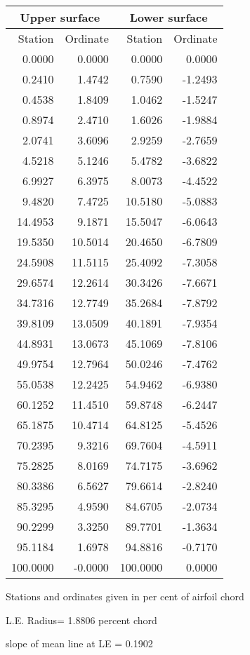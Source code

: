 \documentclass[11pt]{book}
\begin{document}
 \hspace{4mm}
 \begin{tabular}{|r|r|r|r|} \hline 
 \multicolumn{2}{|c|}{Upper surface} & \multicolumn{2}{|c|}{Lower surface} \\
 \hline
 Station & Ordinate & Station & Ordinate \\
 \hline
0.0000 & 0.0000 & 0.0000 & 0.0000 \\
0.2410 & 1.4742 & 0.7590 & -1.2493 \\
0.4538 & 1.8409 & 1.0462 & -1.5247 \\
0.8974 & 2.4710 & 1.6026 & -1.9884 \\
2.0741 & 3.6096 & 2.9259 & -2.7659 \\
4.5218 & 5.1246 & 5.4782 & -3.6822 \\
6.9927 & 6.3975 & 8.0073 & -4.4522 \\
9.4820 & 7.4725 & 10.5180 & -5.0883 \\
14.4953 & 9.1871 & 15.5047 & -6.0643 \\
19.5350 & 10.5014 & 20.4650 & -6.7809 \\
24.5908 & 11.5115 & 25.4092 & -7.3058 \\
29.6574 & 12.2614 & 30.3426 & -7.6671 \\
34.7316 & 12.7749 & 35.2684 & -7.8792 \\
39.8109 & 13.0509 & 40.1891 & -7.9354 \\
44.8931 & 13.0673 & 45.1069 & -7.8106 \\
49.9754 & 12.7964 & 50.0246 & -7.4762 \\
55.0538 & 12.2425 & 54.9462 & -6.9380 \\
60.1252 & 11.4510 & 59.8748 & -6.2447 \\
65.1875 & 10.4714 & 64.8125 & -5.4526 \\
70.2395 & 9.3216 & 69.7604 & -4.5911 \\
75.2825 & 8.0169 & 74.7175 & -3.6962 \\
80.3386 & 6.5627 & 79.6614 & -2.8240 \\
85.3295 & 4.9590 & 84.6705 & -2.0734 \\
90.2299 & 3.3250 & 89.7701 & -1.3634 \\
95.1184 & 1.6978 & 94.8816 & -0.7170 \\
100.0000 & -0.0000 & 100.0000 & 0.0000 \\
 \hline 
 \end{tabular}
 \vspace{8mm}

Stations and ordinates given in per cent of airfoil chord



L.E. Radius=  1.8806 percent chord


 slope of mean line at LE =  0.1902
 \newpage
 
\end{document}
